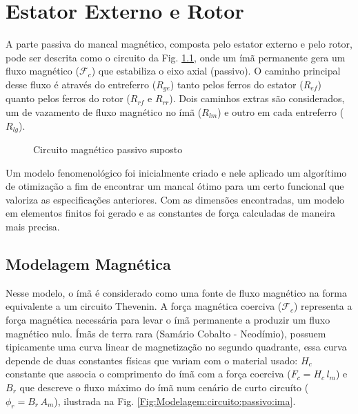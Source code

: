 \pagestyle{empty}
	\cleardoublepage
\pagestyle{fancy}


\chapter{Estator Externo e Rotor}

A parte passiva do mancal magnético, composta pelo estator externo e pelo rotor,  pode ser descrita como o circuito da Fig. \ref{Fig:Modelagem:circuito:passivo:umlado}, onde um ímã permanente gera um fluxo magnético ($\mathcal{F}_c$) que estabiliza o eixo axial (passivo). O caminho principal desse fluxo é através do entreferro ($R_{ge}$) tanto pelos ferros do estator ($R_{ef}$) quanto pelos ferros do rotor ($R_{rf}$ e $R_{rr}$). Dois caminhos extras são considerados, um de vazamento de fluxo magnético no ímã ($R_{lm}$) e outro em cada entreferro ($R_{lg}$). 

\begin{figure}[!ht]
	\centering
	\def\svgwidth{1\columnwidth}
	
	\caption{Circuito magnético passivo suposto}
	\label{Fig:Modelagem:circuito:passivo:umlado}
\end{figure}

Um modelo fenomenológico foi inicialmente criado e nele aplicado um algorítimo de otimização a fim de encontrar um mancal ótimo para um certo funcional que valoriza as especificações anteriores. Com as dimensões encontradas, um modelo em elementos finitos foi gerado e as constantes de força calculadas de maneira mais precisa.

\section{Modelagem Magnética}

Nesse modelo, o ímã é considerado como uma fonte de fluxo magnético na forma equivalente a um circuito Thevenin. A força magnética coerciva ($\mathcal{F}_c$) representa a força magnética necessária para levar o ímã permanente a produzir um fluxo magnético nulo. Ímãs de terra rara (Samário Cobalto - Neodímio), possuem tipicamente uma curva linear de magnetização no segundo quadrante, essa curva depende de duas constantes físicas que variam com o material usado: $H_c$ constante que associa o comprimento do ímã com a força coerciva ($ F_c = H_c \, l_m$) e $B_r$ que descreve o fluxo máximo do ímã num cenário de curto circuíto ($\phi_r = B_r \, A_m$), ilustrada na Fig. \ref{Fig:Modelagem:circuito:passivo:ima}.

